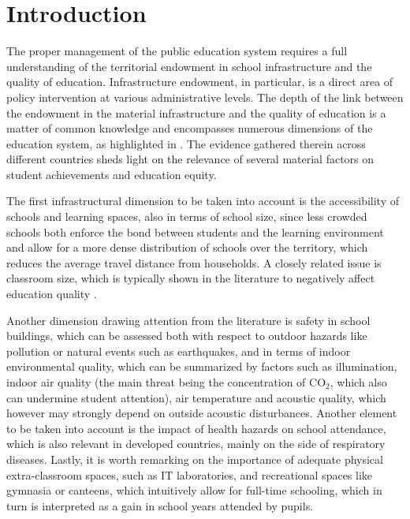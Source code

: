 \documentclass[openany]{book}
\begin{document}
\section{Introduction} \label{section:SchoolDataIT:intro}

The proper management of the public education system requires a full understanding of the territorial endowment in school infrastructure and the quality of education. Infrastructure endowment, in particular, is a direct area of policy intervention at various administrative levels. The depth of the link between the endowment in the material infrastructure and the quality of education is a matter of common knowledge and encompasses numerous dimensions of the education system, as highlighted in \cite{WB}. The evidence gathered therein across different countries sheds light on the relevance of several material factors on student achievements and education equity.

The first infrastructural dimension to be taken into account is the accessibility of schools and learning spaces, also in terms of school size, since less crowded schools both enforce the bond between students and the learning environment and allow for a more dense distribution of schools over the territory, which reduces the average travel distance from households. A closely related issue is classroom size, which is typically shown in the literature to negatively affect education quality \citep{WB}.

Another dimension drawing attention from the literature is safety in school buildings, which can be assessed both with respect to outdoor hazards like pollution or natural events such as earthquakes, and in terms of indoor environmental quality, which can be summarized by factors such as illumination, indoor air quality (the main threat being the concentration of $\mathrm{CO_{2}}$, which also can undermine student attention), air temperature and acoustic quality, which however may strongly depend on outside acoustic disturbances. Another element to be taken into account is the impact of health hazards on school attendance, which is also relevant in developed countries, mainly on the side of respiratory diseases. Lastly, it is worth remarking on the importance of adequate physical extra-classroom spaces, such as IT laboratories, and recreational spaces like gymnasia or canteens, which intuitively allow for full-time schooling, which in turn is interpreted as a gain in school years attended by pupils.
\end{document}
